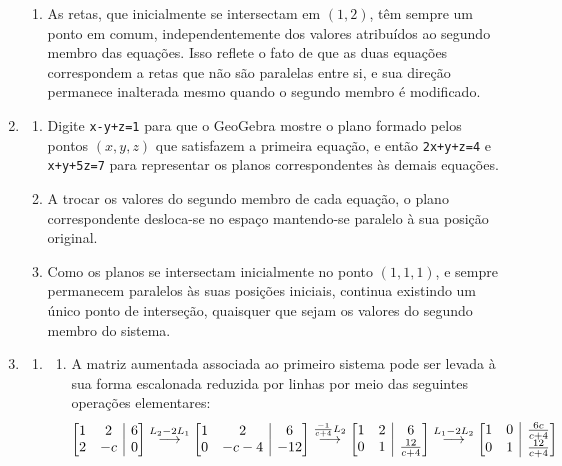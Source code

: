 \documentclass[12pt,a4paper]{article}
\makeatletter
\newenvironment{amatrix}[1]{%
  \left[\begin{array}{@{}*{#1}{c}|c@{}}
}{%
  \end{array}\right]
}
\newcommand{\grstep}[2][\relax]{%
   \ensuremath{\mathrel{
       {\mathop{\longrightarrow}\limits^{#2\mathstrut}_{
                                     \begin{subarray}{l} #1 \end{subarray}}}}}}
\makeatother
\begin{document}
\begin{enumerate}
\begin{enumerate}
\item As retas, que inicialmente se intersectam em $(1,2)$, têm sempre um ponto em comum, independentemente dos valores atribuídos ao segundo membro das equações. Isso reflete o fato de que as duas equações correspondem a retas que não são paralelas entre si, e sua direção permanece inalterada mesmo quando o segundo membro é modificado.
\end{enumerate}


\item
\begin{enumerate}
\item Digite \texttt{x-y+z=1} para que o GeoGebra mostre o plano formado pelos pontos $(x,y,z)$ que satisfazem a primeira equação, e então \texttt{2x+y+z=4} e \texttt{x+y+5z=7} para representar os planos correspondentes às demais equações.
\item A trocar os valores do segundo membro de cada equação, o plano correspondente desloca-se no espaço mantendo-se paralelo à sua posição original.

\item Como os planos se intersectam inicialmente no ponto $(1,1,1)$, e sempre permanecem paralelos às suas posições iniciais, continua existindo um único ponto de interseção, quaisquer que sejam os valores do segundo membro do sistema.
\end{enumerate}

\item
\begin{enumerate}
\item
\begin{enumerate}
\item A matriz aumentada associada ao primeiro sistema pode ser levada à sua forma escalonada reduzida por linhas por meio das seguintes operações elementares:
\[
\begin{amatrix}{2}
1 & 2 & 6 \\
2 & -c & 0
\end{amatrix}
\grstep{ L_2 - 2 L_1 }
\begin{amatrix}{2}
1 & 2 & 6 \\
0 & -c-4 & -12
\end{amatrix}
\grstep{ \frac{-1}{c+4} L_2 }
\begin{amatrix}{2}
1 & 2 & 6 \\
0 & 1 & \frac{12}{c+4}
\end{amatrix}
\grstep{ L_1 - 2 L_2 }
\begin{amatrix}{2}
1 & 0 & \frac{6c}{c+4} \\
0 & 1 & \frac{12}{c+4}
\end{amatrix}
\]


\end{enumerate}
\end{enumerate}
\end{enumerate}
\end{document}
